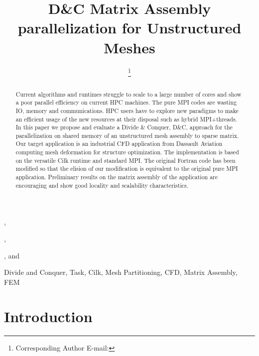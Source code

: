 \documentclass{IOS-Book-Article}
\begin{document}
\begin{frontmatter}              %

\title{D\&C Matrix Assembly parallelization for Unstructured Meshes}

\author[A]{ %
\thanks{Corresponding Author E-mail: }},
\author[A]{ },
\author[A]{ },
and
\author[B]{ }

\address[A]{PRISM - University of Versailles, France}
\address[B]{Dassault Aviation, Saint-Cloud, France}

\begin{abstract}
Current algorithms and runtimes struggle to scale to a large number of cores and show a poor parallel efficiency on current HPC machines.
The pure MPI codes are wasting IO, memory and communications. HPC users have to explore new paradigms to make an efficient usage of the new resources at their disposal
such as hybrid MPI+threads.
In this paper we propose and evaluate a Divide \& Conquer, D\&C, approach for the parallelization on shared memory of an unstructured mesh assembly to sparse matrix.
Our target application is an industrial CFD application from Dassault Aviation computing mesh deformation for structure optimization.
The implementation is based on the versatile Cilk runtime and standard MPI.
The original Fortran code has been modified so that the elision of our modification is equivalent to the original pure MPI application.
Preliminary results on the matrix assembly of the application are encouraging and show good locality and scalability characteristics.
\end{abstract}

\begin{keyword}
Divide and Conquer, Task, Cilk, Mesh Partitioning, CFD, Matrix Assembly, FEM
\end{keyword}
\end{frontmatter}

\thispagestyle{empty}
\pagestyle{empty}

\section{Introduction}
\end{document}
